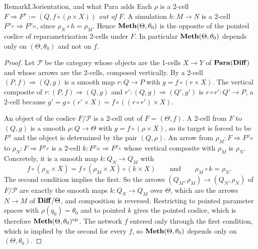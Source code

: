 \begin{restate}{Remark}{I.3}{orientation, and what Para adds}
Each $\rho$ is a 2-cell $F\Rightarrow F^\rho:=(Q,f\circ(\rho\times X))$ \emph{out of} $F$. A simulation $h:M\to N$ is a
2-cell $F^{\rho_N}\Rightarrow F^{\rho_M}$, since $\rho_N\circ h=\rho_M$. Hence $\mathbf{Meth}(\Theta,\theta_0)$ is the opposite
of the pointed coslice of reparametrisation 2-cells under $F$. In particular $\mathbf{Meth}(\Theta,\theta_0)$ depends only on
$(\Theta,\theta_0)$ and not on $f$.
\end{restate}

\begin{proof}
Let $\mathcal P$ be the category whose objects are the 1-cells $X\to Y$ of $\mathbf{Para}(\mathbf{Diff})$ and whose arrows are the
2-cells, composed vertically. By  a 2-cell $(P,f)\Rightarrow(Q,g)$ is a smooth map $r:Q\to P$ with
$g=f\circ(r\times X)$. The vertical composite of $r:(P,f)\Rightarrow(Q,g)$ and $r':(Q,g)\Rightarrow(Q',g')$ is
$r\circ r':Q'\to P$, a 2-cell because $g'=g\circ(r'\times X)=f\circ((r\circ r')\times X)$.

An object of the coslice $F/\mathcal P$ is a 2-cell out of $F=(\Theta,f)$. A 2-cell from $F$ to $(Q,g)$ is a smooth
$\rho:Q\to\Theta$ with $g=f\circ(\rho\times X)$, so its target is forced to be $F^\rho$ and the object is determined by the
pair $(Q,\rho)$. An arrow from $\rho_M:F\Rightarrow F^{\rho_M}$ to $\rho_N:F\Rightarrow F^{\rho_N}$ is a 2-cell
$k:F^{\rho_M}\Rightarrow F^{\rho_N}$ whose vertical composite with $\rho_M$ is $\rho_N$. Concretely, it is a smooth map
$k:Q_N\to Q_M$ with
\begin{equation*}
  f\circ(\rho_N\times X)=f\circ(\rho_M\times X)\circ(k\times X)\qquad\text{and}\qquad\rho_M\circ k=\rho_N .
\end{equation*}
The second condition implies the first. So the arrows $(Q_M,\rho_M)\to(Q_N,\rho_N)$ of $F/\mathcal P$ are exactly the
smooth maps $k:Q_N\to Q_M$ over $\Theta$, which are the arrows $N\to M$ of $\mathbf{Diff}/\Theta$, and composition is reversed.
Restricting to pointed parameter spaces with $\rho(q_0)=\theta_0$ and to pointed $k$ gives the pointed coslice, which is
therefore $\mathbf{Meth}(\Theta,\theta_0)^{\mathrm{op}}$. The network $f$ entered only through the first condition, which is
implied by the second for every $f$, so $\mathbf{Meth}(\Theta,\theta_0)$ depends only on $(\Theta,\theta_0)$.
\end{proof}

